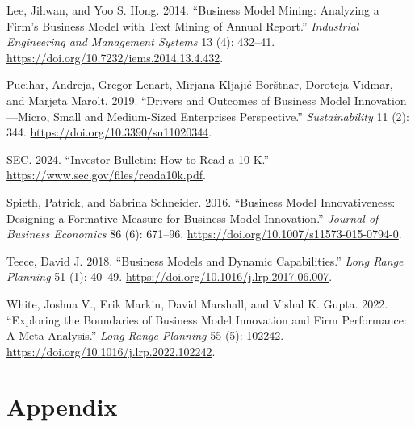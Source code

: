 \documentclass[
]{article}
\newlength{\cslhangindent}
\newenvironment{CSLReferences}[2] %
 {\begin{list}{}{%
  \setlength{\itemindent}{0pt}
  \setlength{\leftmargin}{0pt}
  \setlength{\parsep}{0pt}
  \ifodd #1
   \setlength{\leftmargin}{\cslhangindent}
   \setlength{\itemindent}{-1\cslhangindent}
  \fi
  \setlength{\itemsep}{#2\baselineskip}}}
 {\end{list}}
\begin{document}
\begin{CSLReferences}{1}{0}
Lee, Jihwan, and Yoo S. Hong. 2014. {``Business {Model} {Mining}:
{Analyzing} a {Firm}'s {Business} {Model} with {Text} {Mining} of
{Annual} {Report}.''} \emph{Industrial Engineering and Management
Systems} 13 (4): 432--41.
\url{https://doi.org/10.7232/iems.2014.13.4.432}.

Pucihar, Andreja, Gregor Lenart, Mirjana Kljajić Borštnar, Doroteja
Vidmar, and Marjeta Marolt. 2019. {``Drivers and {Outcomes} of
{Business} {Model} {Innovation}---{Micro}, {Small} and {Medium}-{Sized}
{Enterprises} {Perspective}.''} \emph{Sustainability} 11 (2): 344.
\url{https://doi.org/10.3390/su11020344}.

SEC. 2024. {``Investor {Bulletin}: {How} to {Read} a 10-{K}.''}
\url{https://www.sec.gov/files/reada10k.pdf}.

Spieth, Patrick, and Sabrina Schneider. 2016. {``Business Model
Innovativeness: Designing a Formative Measure for Business Model
Innovation.''} \emph{Journal of Business Economics} 86 (6): 671--96.
\url{https://doi.org/10.1007/s11573-015-0794-0}.

Teece, David J. 2018. {``Business Models and Dynamic Capabilities.''}
\emph{Long Range Planning} 51 (1): 40--49.
\url{https://doi.org/10.1016/j.lrp.2017.06.007}.

White, Joshua V., Erik Markin, David Marshall, and Vishal K. Gupta.
2022. {``Exploring the Boundaries of Business Model Innovation and Firm
Performance: {A} Meta-Analysis.''} \emph{Long Range Planning} 55 (5):
102242. \url{https://doi.org/10.1016/j.lrp.2022.102242}.

\end{CSLReferences}

\newpage{}

\section{Appendix}\label{appendix}
\end{document}
